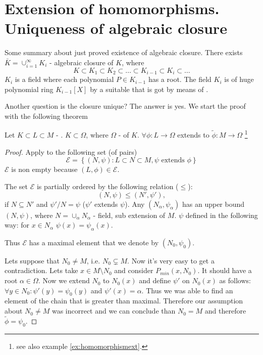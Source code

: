 \section{Extension of homomorphisms. Uniqueness of algebraic closure}

Some summary about just proved existence of algebraic closure. There
exists $\bar{K} = \cup_{i=1}^\infty K_i$ - algebraic closure of $K$,
where
\[
K \subset K_1 \subset K_2 \subset \dots \subset K_{i-1} \subset K_i
\subset \dots
\]
$K_i$ is a field where each polynomial $P \in K_{i-1}$ has a root. The
field $K_i$ is  of huge polynomial ring
$K_{i-1}\left[X\right]$ by a suitable  that is
got by means of .

Another question is the closure unique? The answer is yes. We start
the proof with the following theorem 

\begin{theorem}
  Let $K \subset L \subset M$ - .
  $K \subset \Omega$, where $\Omega$ - 
  of $K$.
  $\forall \phi: L \to \Omega$ extends to $\widetilde{\phi}: M \to
  \Omega$
  \footnote{
    see also example \ref{ex:homomorphismext}.
  }
  \begin{proof}
    Apply  to the following set (of pairs)
    \[
    \mathcal{E} = \left\{
    \left(N, \psi\right): L \subset N \subset M, \psi \mbox{ extends }
    \phi 
    \right\}
    \]
    $\mathcal{E}$ is non empty because $\left(L,\phi\right) \in
    \mathcal{E}$.

    The set $\mathcal{E}$ is partially ordered by the following
    relation ($\le$):
    \[
    \left(N, \psi\right) \le \left(N', \psi'\right),
    \]
    if $N \subseteq N'$ and $\psi'/N = \psi$ ($\psi'$ extends $\psi$).
    Any  $\left(N_\alpha, \psi_\alpha\right)$
    has an upper bound $\left(N, \psi\right)$, where
    \(
    N = \cup_\alpha N_\alpha
    \) - field, sub extension of $M$. $\psi$ defined in the following
    way: for $x \in N_\alpha$ $\psi(x) = \psi_\alpha(x)$.

    Thus $\mathcal{E}$ has a maximal element that we denote by
    $\left(N_0, \psi_0\right)$.

    Lets suppose that $N_0 \ne M$, i.e.
    $N_0 \subsetneq M$. Now it's very easy to get a
    contradiction. Lets take $x \in M \setminus N_0$ and consider
     $P_{min}\left(x, N_0\right)$. It
    should have a root $\alpha \in \Omega$. Now we extend $N_0$ to
    $N_0\left(x\right)$ and define $\psi'$ on
    $N_0\left(x\right)$ as follows: $\forall y \in N_0: \psi'(y)
    = \psi_0(y)$ and $\psi'(x) = \alpha$. Thus we was able to find an
    element of the chain that is greater than maximal. Therefore our
    assumption about $N_0 \ne M$ was incorrect and we can conclude
    than $N_0 = M$ and therefore $\tilde{\phi} = \psi_0$. 
  \end{proof}
  \label{thm:lec2_3}
\end{theorem}

